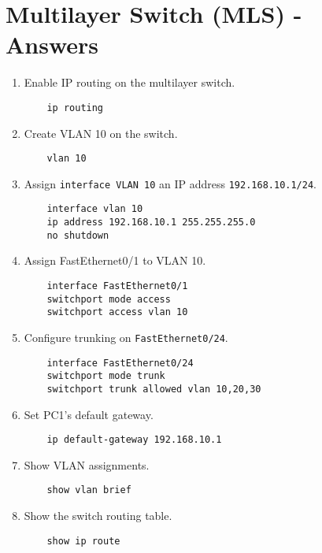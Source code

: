 \documentclass[a4paper]{book}
\begin{document}
\newpage

\chapter{Multilayer Switch (MLS) - Answers}

\begin{enumerate}
    \item Enable IP routing on the multilayer switch.
    \begin{lstlisting}
    ip routing
    \end{lstlisting}

    \item Create VLAN 10 on the switch.
    \begin{lstlisting}
    vlan 10
    \end{lstlisting}

    \item Assign \texttt{interface VLAN 10} an IP address \texttt{192.168.10.1/24}.
    \begin{lstlisting}
    interface vlan 10
    ip address 192.168.10.1 255.255.255.0
    no shutdown
    \end{lstlisting}

    \item Assign FastEthernet0/1 to VLAN 10.
    \begin{lstlisting}
    interface FastEthernet0/1
    switchport mode access
    switchport access vlan 10
    \end{lstlisting}

    \item Configure trunking on \texttt{FastEthernet0/24}.
    \begin{lstlisting}
    interface FastEthernet0/24
    switchport mode trunk
    switchport trunk allowed vlan 10,20,30
    \end{lstlisting}

    \item Set PC1's default gateway.
    \begin{lstlisting}
    ip default-gateway 192.168.10.1
    \end{lstlisting}

    \item Show VLAN assignments.
    \begin{lstlisting}
    show vlan brief
    \end{lstlisting}

    \item Show the switch routing table.
    \begin{lstlisting}
    show ip route
    \end{lstlisting}


\end{enumerate}
\end{document}

